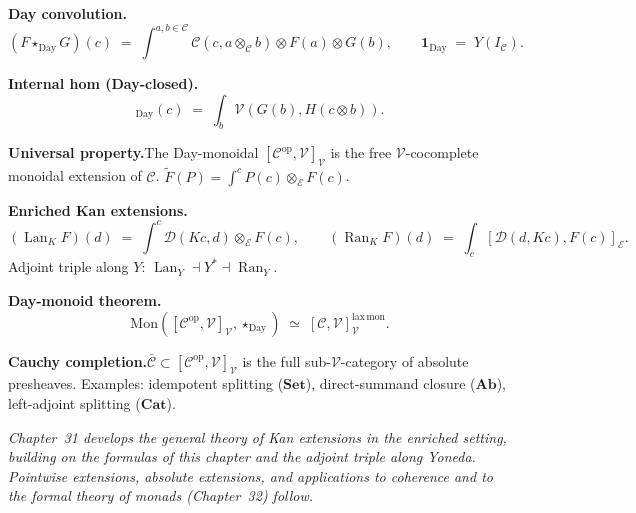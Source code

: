 \begin{formalrestatement}
\textbf{Day convolution.}\quad
\begin{equation*}
  (F \star_{\mathrm{Day}} G)(c) \;=\; \int^{a, b \in \mathcal{C}}
  \mathcal{C}(c, a \otimes_\mathcal{C} b) \otimes F(a) \otimes G(b),
  \qquad \mathbf{1}_{\mathrm{Day}} \;=\; Y(I_\mathcal{C}).
\end{equation*}

\medskip
\textbf{Internal hom (Day-closed).}\quad
\begin{equation*}
  [G, H]_{\mathrm{Day}}(c) \;=\; \int_b \mathcal{V}(G(b), H(c \otimes b)).
\end{equation*}

\medskip
\textbf{Universal property.}\quad The Day-monoidal $[\mathcal{C}^{\mathrm{op}},
\mathcal{V}]_\mathcal{V}$ is the free $\mathcal{V}$-cocomplete monoidal
extension of $\mathcal{C}$. $\widetilde F(P) = \int^c P(c) \otimes_\mathcal{E} F(c)$.

\medskip
\textbf{Enriched Kan extensions.}\quad
\begin{equation*}
  (\operatorname{Lan}_K F)(d) \;=\; \int^c \mathcal{D}(K c, d) \otimes_\mathcal{E} F(c),
  \qquad
  (\operatorname{Ran}_K F)(d) \;=\; \int_c [\mathcal{D}(d, K c), F(c)]_\mathcal{E}.
\end{equation*}
Adjoint triple along $Y$: $\operatorname{Lan}_Y \dashv Y^* \dashv \operatorname{Ran}_Y$.

\medskip
\textbf{Day-monoid theorem.}\quad
\begin{equation*}
  \mathrm{Mon}([\mathcal{C}^{\mathrm{op}}, \mathcal{V}]_\mathcal{V},
  \star_{\mathrm{Day}}) \;\simeq\; [\mathcal{C}, \mathcal{V}]_\mathcal{V}^{\mathrm{lax\,mon}}.
\end{equation*}

\medskip
\textbf{Cauchy completion.}\quad $\bar{\mathcal{C}} \subset [\mathcal{C}^{\mathrm{op}},
\mathcal{V}]_\mathcal{V}$ is the full sub-$\mathcal{V}$-category of absolute
presheaves. Examples: idempotent splitting ($\mathbf{Set}$), direct-summand
closure ($\mathbf{Ab}$), left-adjoint splitting ($\mathbf{Cat}$).

\medskip
\noindent\textit{Chapter~31 develops the general theory of Kan extensions
in the enriched setting, building on the formulas of this chapter and the
adjoint triple along Yoneda. Pointwise extensions, absolute extensions, and
applications to coherence and to the formal theory of monads (Chapter~32)
follow.}
\end{formalrestatement}
